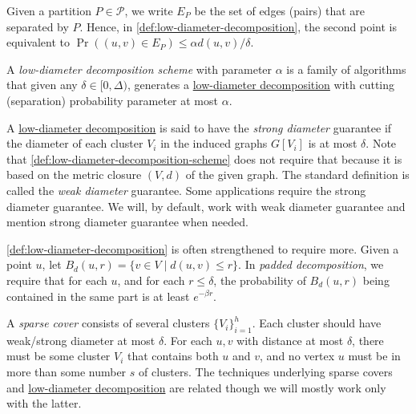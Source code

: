 Given a partition \(P \in \mathcal{P} \), we write \(E_P\) be the set of edges (pairs) that are separated by \(P\). Hence, in \autoref{def:low-diameter-decomposition}, the second point is equivalent to \(\Pr((u, v) \in E_P) \leq \alpha d(u, v) / \delta \).

\begin{definition}\label{def:low-diameter-decomposition-scheme}
  A \emph{low-diameter decomposition scheme} with parameter \(\alpha \) is a family of algorithms that given any \(\delta \in [0, \Delta )\), generates a \hyperref[def:low-diameter-decomposition]{low-diameter decomposition} with cutting (separation) probability parameter at most \(\alpha \).
\end{definition}

\begin{notation}
  A \hyperref[def:low-diameter-decomposition]{low-diameter decomposition} is said to have the \emph{strong diameter} guarantee if the diameter of each cluster \(V_i\) in the induced graphs \(G[V_i]\) is at most \(\delta \). Note that \autoref{def:low-diameter-decomposition-scheme} does not require that because it is based on the metric closure \((V, d)\) of the given graph. The standard definition is called the \emph{weak diameter} guarantee. Some applications require the strong diameter guarantee. We will, by default, work with weak diameter guarantee and mention strong diameter guarantee when needed.
\end{notation}

\begin{note}
  \autoref{def:low-diameter-decomposition} is often strengthened to require more. Given a point \(u\), let \(B_d(u, r) = \{ v \in V \mid d(u, v) \leq r \} \). In \emph{padded decomposition}, we require that for each \(u\), and for each \(r \leq \delta \), the probability of \(B_d(u, r)\) being contained in the same part is at least \(e^{-\beta r}\).
\end{note}

\begin{remark}
  A \emph{sparse cover} consists of several clusters \(\{ V_i \} _{i = 1}^{h}\). Each cluster should have weak/strong diameter at most \(\delta \). For each \(u, v\) with distance at most \(\delta \), there must be some cluster \(V_i\) that contains both \(u\) and \(v\), and no vertex \(u\) must be in more than some number \(s\) of clusters. The techniques underlying sparse covers and \hyperref[def:low-diameter-decomposition]{low-diameter decomposition} are related though we will mostly work only with the latter.
\end{remark}

